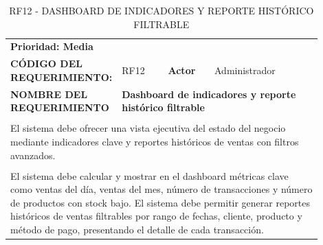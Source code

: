 \begingroup
\renewcommand{\arraystretch}{1.3}
\setlength{\tabcolsep}{6pt}
\centering
\begin{longtable}{|p{0.25\linewidth}|p{0.15\linewidth}|p{0.15\linewidth}|p{0.35\linewidth}|}
\caption{RF12 - DASHBOARD DE INDICADORES Y REPORTE HISTÓRICO FILTRABLE}\label{tab:rf12}\\
\hline
		\rowcolor{tableheaderblue}
		\multicolumn{4}{|l|}{\textbf{Requerimientos funcionales}}                                                                                                                                                      \\ \hline
		\multicolumn{4}{|l|}{\textbf{Prioridad: Media}}                                                                                                                                                                \\ \hline
		\textbf{CÓDIGO DEL REQUERIMIENTO:}                          & RF12                                                                                 & \cellcolor{tableheaderblue}\textbf{Actor} & Administrador \\ \hline
		\textbf{NOMBRE DEL REQUERIMIENTO}                           & \multicolumn{3}{l|}{\textbf{Dashboard de indicadores y reporte histórico filtrable}}                                                             \\ \hline
		\rowcolor{tableheaderblue}
		\multicolumn{4}{|l|}{\textbf{Descripción}}                                                                                                                                                                     \\ \hline
		\multicolumn{4}{|p{0.96\linewidth}|}{%
		El sistema debe ofrecer una vista ejecutiva del estado del negocio mediante indicadores clave y reportes históricos de ventas con filtros avanzados.}                                                          \\ \hline
		\rowcolor{tableheaderblue}
		\multicolumn{4}{|l|}{\textbf{Funcionalidad}}                                                                                                                                                                   \\ \hline
		\multicolumn{4}{|p{0.96\linewidth}|}{%
		El sistema debe calcular y mostrar en el dashboard métricas clave como ventas del día, ventas del mes, número de transacciones y número de productos con stock bajo. \newline
		El sistema debe permitir generar reportes históricos de ventas filtrables por rango de fechas, cliente, producto y método de pago, presentando el detalle de cada transacción. \newline
}
\end{longtable}
